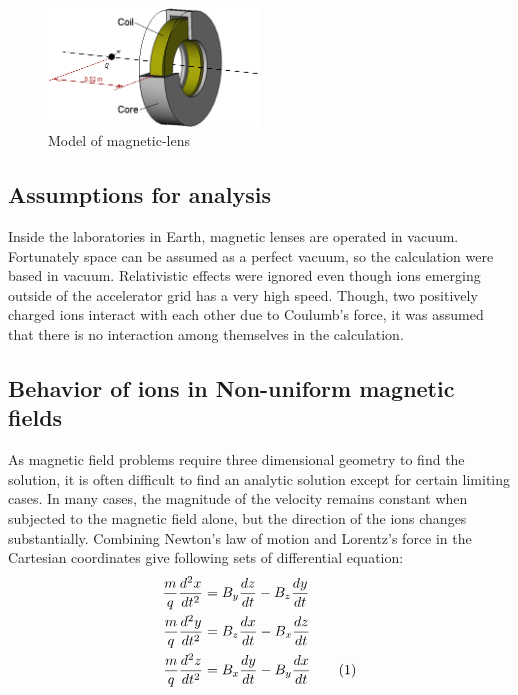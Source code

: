 \documentclass[twocolumn,12pt]{article}
\newcommand\numberthis{\addtocounter{equation}{1}\tag{\theequation}} %
\numberwithin{equation}{section} %
\numberwithin{equation}{section}
\begin{document}
\begin{figure}[H]
    \centering
    \includegraphics[width=0.5\textwidth]{figs/magnetic_lense_model.png}
    \caption{Model of magnetic-lens \cite{maglens}}
    \label{maglen}
\end{figure}

\subsection{Assumptions for analysis}
Inside the laboratories in Earth, magnetic lenses are operated in vacuum. Fortunately space can be assumed as a perfect vacuum, so the calculation were based in vacuum. Relativistic effects were ignored even though ions emerging outside of the accelerator grid has a very high speed. Though, two positively charged ions interact with each other due to Coulumb's force, it was assumed that there is no interaction among themselves in the calculation. 


\subsection{Behavior of ions in Non-uniform magnetic fields}
As magnetic field problems require three dimensional geometry to find the solution, it is often difficult to find an analytic solution except for certain limiting cases. In many cases, the magnitude of the velocity remains constant when subjected to the magnetic field alone\cite{booktheory}, but the direction of the ions changes substantially. Combining Newton's law of motion and Lorentz's force in the Cartesian coordinates give following sets of differential equation:
\begin{align*}
    \frac{m}{q} \frac{d^2x}{dt^2}&=B_y\frac{dz}{dt}-B_z\frac{dy}{dt}\\
    \frac{m}{q} \frac{d^2y}{dt^2}&=B_z\frac{dx}{dt}-B_x\frac{dz}{dt}\\
    \frac{m}{q} \frac{d^2z}{dt^2}&=B_x\frac{dy}{dt}-B_y\frac{dx}{dt} \numberthis{}
    \label{cartesiancoord}
\end{align*}
\end{document}
